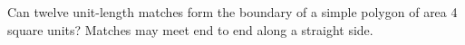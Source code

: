 Can twelve unit-length matches form the boundary of a simple polygon of area 4 square units? Matches may meet end to end along a straight side.
